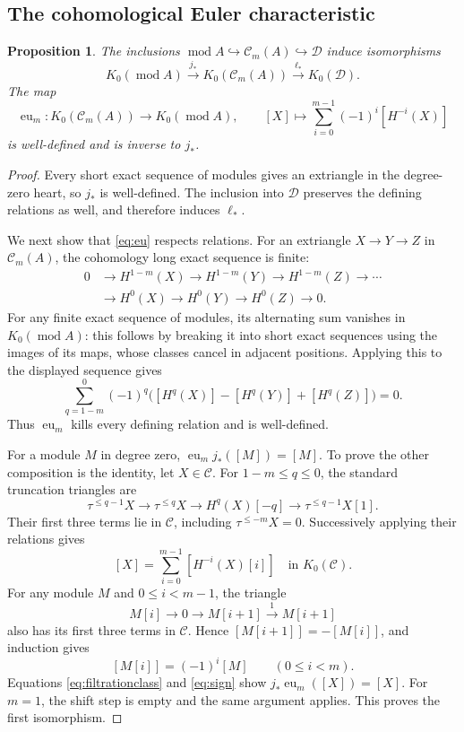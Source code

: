 \documentclass[pdflatex,sn-mathphys-num]{sn-jnl}
\numberwithin{equation}{section}
\newtheorem{proposition}[theorem]{Proposition}
\theoremstyle{definition}
\theoremstyle{remark}\newtheorem{remark}[theorem]{Remark}
\newcommand{\C}{\mathcal C}
\newcommand{\D}{\mathcal D}
\newcommand{\modu}{\operatorname{mod}}
\newcommand{\eu}{\operatorname{eu}}
\begin{document}
\subsection{The cohomological Euler characteristic}
\begin{proposition}\label{thm:K0}
The inclusions $\modu A\hookrightarrow\C_m(A)\hookrightarrow\D$ induce
isomorphisms
\[
 K_0(\modu A)\xrightarrow{j_*}K_0(\C_m(A))
 \xrightarrow{\ell_*}K_0(\D).
\]
The map
\begin{equation}\label{eq:eu}
 \eu_m:K_0(\C_m(A))\longrightarrow K_0(\modu A),\qquad
 [X]\longmapsto\sum_{i=0}^{m-1}(-1)^i[H^{-i}(X)]
\end{equation}
is well-defined and is inverse to $j_*$.
\end{proposition}
\begin{proof}
Every short exact sequence of modules gives an extriangle in the
degree-zero heart, so $j_*$ is well-defined. The inclusion into $\D$
preserves the defining relations as well, and therefore induces $\ell_*$.

We next show that \eqref{eq:eu} respects relations. For an extriangle
$X\to Y\to Z$ in $\C_m(A)$, the cohomology long exact sequence is finite:
\[
\begin{aligned}
0&\longrightarrow H^{1-m}(X)\longrightarrow H^{1-m}(Y)
 \longrightarrow H^{1-m}(Z)\longrightarrow\cdots\\
 &\longrightarrow H^0(X)\longrightarrow H^0(Y)
 \longrightarrow H^0(Z)\longrightarrow0.
\end{aligned}
\]
For any finite exact sequence of modules, its alternating sum
vanishes in $K_0(\modu A)$: this follows by breaking it into short exact
sequences using the images of its maps, whose classes cancel in adjacent
positions. Applying this to the displayed sequence gives
\[
 \sum_{q=1-m}^0(-1)^q
       \bigl([H^q(X)]-[H^q(Y)]+[H^q(Z)]\bigr)=0.
\]
Thus $\eu_m$ kills every defining relation and is well-defined.

For a module $M$ in degree zero, $\eu_mj_*([M])=[M]$.
To prove the other composition is the identity, let $X\in\C$.
For $1-m\leq q\leq0$, the standard truncation triangles are
\begin{equation}\label{eq:trunc}
 \tau^{\leq q-1}X\longrightarrow\tau^{\leq q}X
 \longrightarrow H^q(X)[-q]\longrightarrow\tau^{\leq q-1}X[1].
\end{equation}
Their first three terms lie in $\C$, including
$\tau^{\leq-m}X=0$. Successively applying their relations gives
\begin{equation}\label{eq:filtrationclass}
 [X]=\sum_{i=0}^{m-1}[H^{-i}(X)[i]]\quad\text{in }K_0(\C).
\end{equation}
For any module $M$ and $0\leq i<m-1$, the triangle
\[
 M[i]\longrightarrow0\longrightarrow M[i+1]
 \xrightarrow{1}M[i+1]
\]
also has its first three terms in $\C$. Hence
$[M[i+1]]=-[M[i]]$, and induction gives
\begin{equation}\label{eq:sign}
 [M[i]]=(-1)^i[M]\qquad(0\leq i<m).
\end{equation}
Equations \eqref{eq:filtrationclass} and \eqref{eq:sign} show
$j_*\eu_m([X])=[X]$. For $m=1$, the shift step is empty and the same
argument applies. This proves the first isomorphism.


\end{proof}
\end{document}
